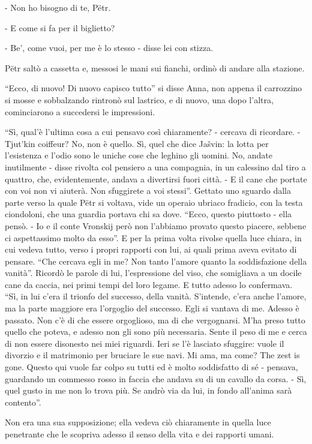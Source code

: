 - Non ho bisogno di te, Pëtr. 

- E come si fa per il biglietto? 

- Be', come vuoi, per me è lo stesso - disse lei con stizza. 

Pëtr saltò a cassetta e, messosi le mani sui fianchi, ordinò di andare alla stazione. 

``Ecco, di nuovo! Di nuovo capisco tutto'' si disse Anna, non appena il carrozzino si mosse e sobbalzando rintronò sul lastrico, e di nuovo, una dopo l'altra, cominciarono a succedersi le impressioni. 

``Sì, qual'è l'ultima cosa a cui pensavo così chiaramente? - cercava di ricordare. - Tjut'kin coiffeur? No, non è quello. Sì, quel che dice Jašvin: la lotta per l'esistenza e l'odio sono le uniche cose che leghino gli uomini. No, andate inutilmente - disse rivolta col pensiero a una compagnia, in un calessino dal tiro a quattro, che, evidentemente, andava a divertirsi fuori città. - E il cane che portate con voi non vi aiuterà. Non sfuggirete a voi stessi''. Gettato uno sguardo dalla parte verso la quale Pëtr si voltava, vide un operaio ubriaco fradicio, con la testa ciondoloni, che una guardia portava chi sa dove. ``Ecco, questo piuttosto - ella pensò. - Io e il conte Vronskij però non l'abbiamo provato questo piacere, sebbene ci aspettassimo molto da esso''. E per la prima volta rivolse quella luce chiara, in cui vedeva tutto, verso i propri rapporti con lui, ai quali prima aveva evitato di pensare. ``Che cercava egli in me? Non tanto l'amore quanto la soddisfazione della vanità''. Ricordò le parole di lui, l'espressione del viso, che somigliava a un docile cane da caccia, nei primi tempi del loro legame. E tutto adesso lo confermava. ``Sì, in lui c'era il trionfo del successo, della vanità. S'intende, c'era anche l'amore, ma la parte maggiore era l'orgoglio del successo. Egli si vantava di me. Adesso è passato. Non c'è di che essere orgoglioso, ma di che vergognarsi. M'ha preso tutto quello che poteva, e adesso non gli sono più necessaria. Sente il peso di me e cerca di non essere disonesto nei miei riguardi. Ieri se l'è lasciato sfuggire: vuole il divorzio e il matrimonio per bruciare le sue navi. Mi ama, ma come? The zest is gone. Questo qui vuole far colpo su tutti ed è molto soddisfatto di sé - pensava, guardando un commesso rosso in faccia che andava su di un cavallo da corsa. - Sì, quel gusto in me non lo trova più. Se andrò via da lui, in fondo all'anima sarà contento''. 

Non era una sua supposizione; ella vedeva ciò chiaramente in quella luce penetrante che le scopriva adesso il senso della vita e dei rapporti umani. 

